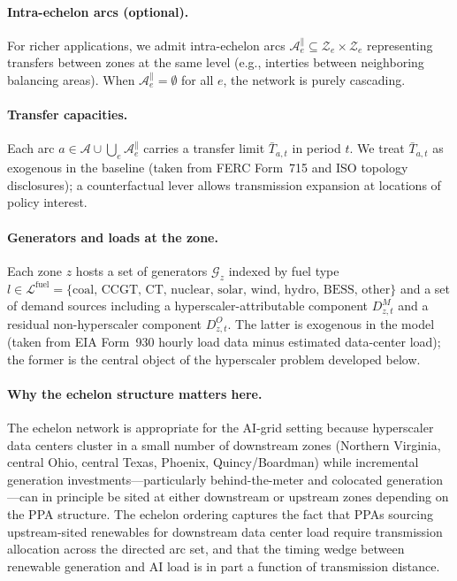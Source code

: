\documentclass[12pt,letterpaper]{article}
\begin{document}
\paragraph{Intra-echelon arcs (optional).} For richer applications, we admit
intra-echelon arcs $\mathcal{A}^{\parallel}_e \subseteq \mathcal{Z}_e \times
\mathcal{Z}_e$ representing transfers between zones at the same level
(e.g., interties between neighboring balancing areas). When
$\mathcal{A}^{\parallel}_e = \emptyset$ for all $e$, the network is purely
cascading.

\paragraph{Transfer capacities.} Each arc $a \in \mathcal{A} \cup
\bigcup_e \mathcal{A}^{\parallel}_e$ carries a transfer limit $\bar T_{a,t}$
in period $t$. We treat $\bar T_{a,t}$ as exogenous in the baseline (taken
from FERC Form~715 and ISO topology disclosures); a counterfactual lever
allows transmission expansion at locations of policy interest.

\paragraph{Generators and loads at the zone.} Each zone $z$ hosts a set of
generators $\mathcal{G}_z$ indexed by fuel type $l \in \mathcal{L}^{\text{fuel}}
= \{\text{coal, CCGT, CT, nuclear, solar, wind, hydro, BESS, other}\}$ and
a set of demand sources including a hyperscaler-attributable component
$D^M_{z,t}$ and a residual non-hyperscaler component $D^O_{z,t}$. The latter
is exogenous in the model (taken from EIA Form~930 hourly load data minus
estimated data-center load); the former is the central object of the
hyperscaler problem developed below.

\paragraph{Why the echelon structure matters here.} The echelon network is
appropriate for the AI-grid setting because hyperscaler data centers cluster
in a small number of downstream zones (Northern Virginia, central Ohio,
central Texas, Phoenix, Quincy/Boardman) while incremental generation
investments---particularly behind-the-meter and colocated generation---can
in principle be sited at either downstream or upstream zones depending on
the PPA structure. The echelon ordering captures the fact that PPAs sourcing
upstream-sited renewables for downstream data center load require transmission
allocation across the directed arc set, and that the timing wedge between
renewable generation and AI load is in part a function of transmission
distance.
\end{document}
